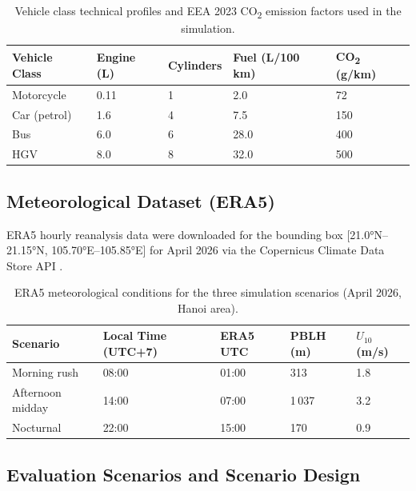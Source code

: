 \documentclass[12pt,a4paper]{article}
\begin{document}
\begin{table}[H]
\centering
\caption{Vehicle class technical profiles and EEA 2023 CO\textsubscript{2} emission factors used in the simulation.}
\label{tab:fleet}
\small\begin{tabularx}{\textwidth}{L{3.2cm} C{1.9cm} C{1.9cm} C{2.5cm} C{2.5cm}}
\toprule
\textbf{Vehicle Class} & \textbf{Engine (L)} & \textbf{Cylinders} & \textbf{Fuel (L/100 km)} & \textbf{CO\textsubscript{2} (g/km)} \\
\midrule
Motorcycle  & 0.11 & 1 & 2.0  & 72  \\
Car (petrol) & 1.6  & 4 & 7.5  & 150 \\
Bus          & 6.0  & 6 & 28.0 & 400 \\
HGV          & 8.0  & 8 & 32.0 & 500 \\
\bottomrule
\end{tabularx}
\end{table}

\subsection{Meteorological Dataset (ERA5)}

ERA5 hourly reanalysis data were downloaded for the bounding box [21.0°N--21.15°N, 105.70°E--105.85°E] for April 2026 via the Copernicus Climate Data Store API \cite{Hersbach2020,CDS2024}.

\begin{table}[H]
\centering
\caption{ERA5 meteorological conditions for the three simulation scenarios (April 2026, Hanoi area).}
\label{tab:era5}
\small\begin{tabularx}{\textwidth}{L{2.9cm} C{2.7cm} C{2.2cm} C{2.0cm} C{2.0cm}}
\toprule
\textbf{Scenario} & \textbf{Local Time (UTC+7)} & \textbf{ERA5 UTC} & \textbf{PBLH (m)} & \textbf{$U_{10}$ (m/s)} \\
\midrule
Morning rush    & 08:00 & 01:00 & 313   & 1.8 \\
Afternoon midday & 14:00 & 07:00 & 1\,037 & 3.2 \\
Nocturnal       & 22:00 & 15:00 & 170   & 0.9 \\
\bottomrule
\end{tabularx}
\end{table}

\subsection{Evaluation Scenarios and Scenario Design}
\end{document}
